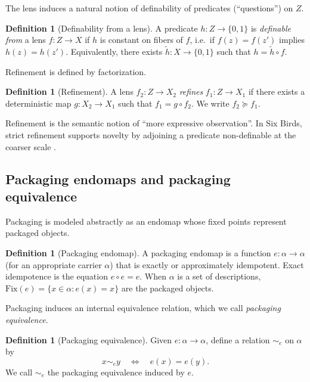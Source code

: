 \documentclass[11pt]{article}
\theoremstyle{definition}
\newtheorem{definition}[theorem]{Definition}
\theoremstyle{remark}
\begin{document}
The lens induces a natural notion of definability of predicates (``questions'') on $Z$.

\begin{definition}[Definability from a lens]
\label{def:definability}
A predicate $h:Z\to\{0,1\}$ is \emph{definable from} a lens $f:Z\to X$ if $h$ is constant on fibers of $f$, i.e.\ if $f(z)=f(z')$ implies $h(z)=h(z')$.
Equivalently, there exists $\tilde h:X\to\{0,1\}$ such that $h=\tilde h\circ f$.
\end{definition}

Refinement is defined by factorization.

\begin{definition}[Refinement]
\label{def:refinement}
A lens $f_2:Z\to X_2$ \emph{refines} $f_1:Z\to X_1$ if there exists a deterministic map $g:X_2\to X_1$ such that $f_1=g\circ f_2$.
We write $f_2 \succeq f_1$.
\end{definition}

Refinement is the semantic notion of ``more expressive observation''.
In Six Birds, strict refinement supports novelty by adjoining a predicate non-definable at the coarser scale \citep{sixbirds2026}.

\subsection{Packaging endomaps and packaging equivalence}
\label{sec:def-packaging}

Packaging is modeled abstractly as an endomap whose fixed points represent packaged objects.

\begin{definition}[Packaging endomap]
\label{def:packaging-endomap}
A packaging endomap is a function $e:\alpha\to\alpha$ (for an appropriate carrier $\alpha$) that is exactly or approximately idempotent.
Exact idempotence is the equation $e\circ e = e$.
When $\alpha$ is a set of descriptions, $\mathrm{Fix}(e)=\{x\in\alpha: e(x)=x\}$ are the packaged objects.
\end{definition}

Packaging induces an internal equivalence relation, which we call \emph{packaging equivalence}.

\begin{definition}[Packaging equivalence]
\label{def:packeq}
Given $e:\alpha\to\alpha$, define a relation $\sim_e$ on $\alpha$ by
\[
x\sim_e y \quad\Longleftrightarrow\quad e(x)=e(y).
\]
We call $\sim_e$ the packaging equivalence induced by $e$.
\end{definition}
\end{document}
